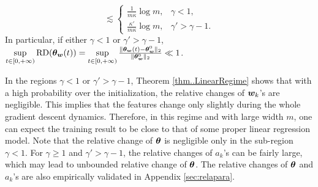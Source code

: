 \documentclass[twoside,11pt]{article}
\begin{document}
\begin{thm}
\begin{enumerate}[resume*]
\begin{equation}
                  \lesssim
                  \left\{
                  \begin{array}{cc}
                      \frac{1}{m\kappa}\log m,       & \gamma<1,         \\
                      \frac{\kappa'}{m\kappa}\log m, & \gamma'>\gamma-1.
                  \end{array}\right.
              \end{equation}
              In particular, if either $\gamma<1$ or $\gamma'>\gamma-1$, $\sup\limits_{t\in[0,+\infty)}\mathrm{RD}(\bm{\theta}_{\bm{w}}(t))=\sup\limits_{t\in[0,+\infty)}\frac{\lVert\bm{\theta}_{\bm{w}}(t)-\bm{\theta}_{\bm{w}}^0\rVert_2}{\lVert\bm{\theta}_{\bm{w}}^0\rVert_2}\ll1$.
    \end{enumerate}
\end{thm}
\begin{rmk}
    In the regions $\gamma<1$ or $\gamma'>\gamma-1$,
    Theorem \ref{thm..LinearRegime} shows that with a high probability over the initialization, the relative changes of $\bm{w}_k$'s are negligible. This implies that the features change only slightly during the whole gradient descent dynamics. Therefore, in this regime and with large width $m$, one can expect the training result to be close to that of some proper linear regression model. Note that the relative change of $\bm{\theta}$ is negligible only in the sub-region $\gamma<1$. For $\gamma\geq 1$ and $\gamma'>\gamma-1$, the relative changes of $a_k$'s can be fairly large, which may lead to unbounded relative change of $\bm{\theta}$. The relative changes of $\bm{\theta}$ and $a_k$'s are also empirically validated in Appendix \ref{sec:relapara}.
\end{rmk}
\end{document}
